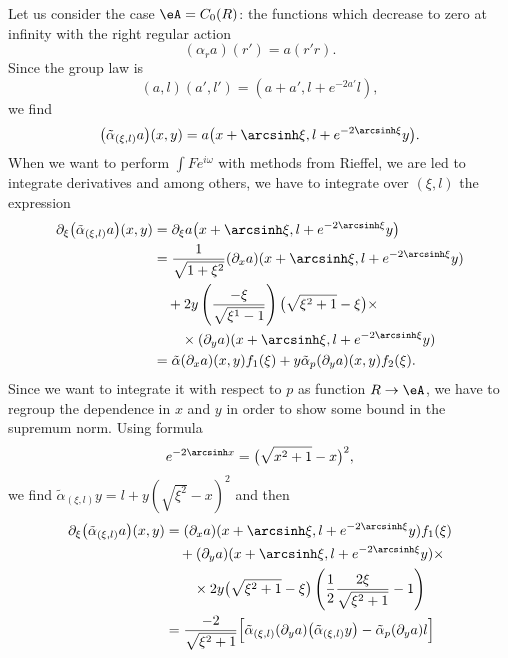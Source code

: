 Let us consider the case $\eA=C_0(R)$: the functions which decrease to zero at infinity with the right regular action
\[
	(\alpha_ra)(r')=a(r'r).
\]
Since the group law is
\[
	(a,l)(a',l')=(a+a',l+e^{-2a'}l),
\]
we find
\begin{equation}
	\big( \tilde\alpha_{(\xi,l)}a \big)(x,y)=a\big( x+\arcsinh\xi,l+e^{-2\arcsinh\xi}y \big).
\end{equation}
When we want to perform $\int Fe^{i\omega}$ with methods from Rieffel, we are led to integrate derivatives and among others, we have to integrate over $(\xi,l)$ the expression
\begin{equation}
	\begin{split}
		\partial_{\xi}\big(\tilde\alpha_{(\xi,l)}a\big)(x,y)&=\partial_{\xi}a\big( x+\arcsinh\xi,l+e^{-2\arcsinh\xi}y \big)\\
		&=\frac{1}{ \sqrt{1+\xi^2} }(\partial_xa)( x+\arcsinh\xi,l+e^{-2\arcsinh\xi}y )\\
		&\quad +2y\left( \frac{ -\xi }{ \sqrt{\xi^1-1} } \right)\big(\sqrt{\xi^2+1}-\xi\big)\times\\
		&\qquad\times(\partial_ya)( x+\arcsinh\xi,l+e^{-2\arcsinh\xi}y )\\
		&=\tilde\alpha(\partial_xa)(x,y)f_1(\xi)+y\tilde\alpha_p(\partial_ya)(x,y)f_2(\xi).
	\end{split}
\end{equation}
Since we want to integrate it with respect to $p$ as function $R\to \eA$, we have to regroup the dependence in $x$ and $y$ in order to show some bound in the supremum norm. Using formula
\[
	e^{-2\arcsinh x}=\big( \sqrt{x^2+1}-x \big)^2,
\]
we find $\tilde\alpha_{(\xi,l)}y=l+y(\sqrt{\xi^2}-x)^2$ and then
\begin{subequations}
	\begin{align}
		\partial_{\xi}\big( \tilde\alpha_{(\xi,l)}a \big)(x,y) & =(\partial_xa)( x+\arcsinh\xi,l+e^{-2\arcsinh\xi}y )f_1(\xi)                                                                                    \\
		                                                       & \quad+( \partial_ya)(x+\arcsinh\xi,l+e^{-2\arcsinh\xi}y)\times                                                                                  \\
		                                                       & \qquad\times 2y\big( \sqrt{\xi^2+1}-\xi \big)\left( \frac{ 1 }{2}\frac{ 2\xi }{ \sqrt{\xi^2+1} }-1 \right)                                      \\
		                                                       & =\frac{ -2 }{ \sqrt{\xi^2+1} }\Big[  \tilde\alpha_{(\xi,l)}(\partial_ya)\big( \tilde\alpha_{(\xi,l)}y\big)-\tilde\alpha_p(\partial_ya) l  \Big]
	\end{align}
\end{subequations}
